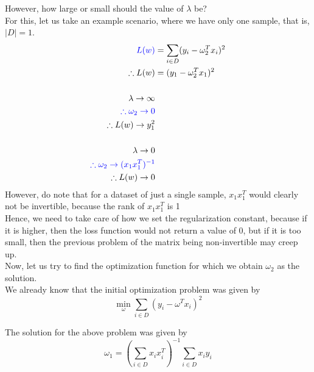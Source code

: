 \documentclass[11pt, twosides]{article}
\begin{document}
{However, how large or small should the value of $\lambda$ be?\\
For this, let us take an example scenario, where we have only one sample, that is, $|D| = 1$.
\begin{align*}
\color{blue}
    L(w) &= \sum_{i \in D} (y_i - \omega_2^T x_i)^2\\
    \therefore L(w) &= (y_1 - \omega_2^T x_1)^2\\
    \\ 
    \color{black}
    \lambda \rightarrow \infty\\ 
    \color{blue}
    \therefore \omega_2 \rightarrow 0\\
    \therefore L(w) \rightarrow y_1^2\\
    \\ 
    \color{black}
    \lambda \rightarrow 0\\ 
    \color{blue}
    \therefore \omega_2 \rightarrow (x_1x_1^T)^{-1}\\
    \therefore L(w) \rightarrow 0\\
\end{align*}
\color{black}
However, do note that for a dataset of just a single sample, $x_1x_1^T$ would clearly not be invertible, because the rank of $x_1x_1^T$ is 1\\
Hence, we need to take care of how we set the regularization constant, because if it is higher, then the loss function would not return a value of $0$, but if it is too small, then the previous problem of the matrix being non-invertible may creep up.\\

Now, let us try to find the optimization function for which we obtain $\omega_2$ as the solution.\\

We already know that the initial optimization problem was given by
\begin{equation*}
    \min_{\omega} \sum_{i \in D} (y_i - \omega^T x_i)^2 
\end{equation*}

The solution for the above problem was given by
\begin{equation*}
    \omega_1 = (\sum_{i \in D} x_ix_i^T)^{-1} \sum_{i \in D} x_iy_i
\end{equation*}

}
\end{document}
